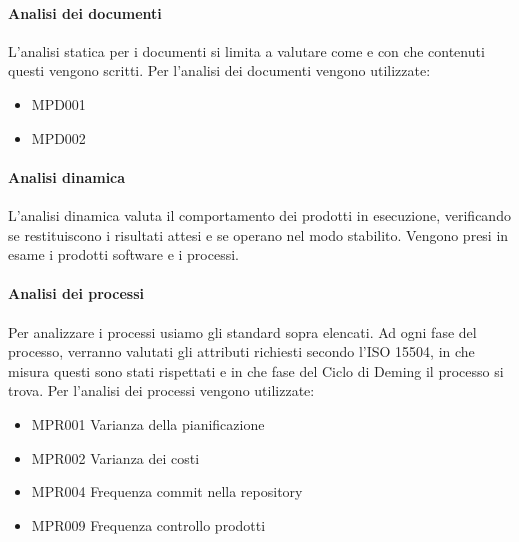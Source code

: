 			\paragraph{Analisi dei documenti}
			L'analisi statica per i documenti si limita a valutare come e con che contenuti questi vengono scritti.
			Per l'analisi dei documenti vengono utilizzate:

			\begin{itemize}
				\item MPD001
				\item MPD002
			\end{itemize}

			\paragraph{Analisi dinamica}
			L'analisi dinamica valuta il comportamento dei prodotti in esecuzione, verificando se restituiscono i risultati attesi e se operano nel modo stabilito.
			Vengono presi in esame i prodotti software e i processi.

			\paragraph{Analisi dei processi}
			Per analizzare i processi usiamo gli standard sopra elencati. Ad ogni fase del processo, verranno valutati gli attributi richiesti secondo
			l'ISO 15504, in che misura questi sono stati rispettati e in che fase del Ciclo di Deming il processo si trova.
			Per l'analisi dei processi vengono utilizzate:

			\begin{itemize}
				\item MPR001 Varianza della pianificazione
				\item MPR002 Varianza dei costi
				\item MPR004 Frequenza commit nella repository
				\item MPR009 Frequenza controllo prodotti
			\end{itemize}




